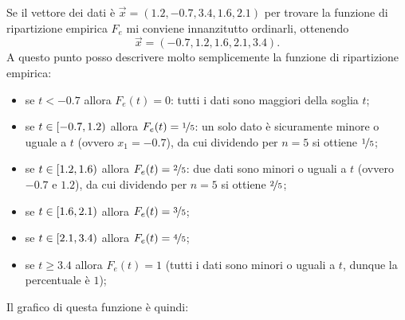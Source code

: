 \begin{example}
    Se il vettore dei dati è $\vec x = (1.2, -0.7, 3.4, 1.6, 2.1)$ per trovare la funzione di ripartizione empirica $F_e$ mi conviene innanzitutto ordinarli, ottenendo \[
        \vec x = (-0.7, 1.2, 1.6, 2.1, 3.4).    
    \] A questo punto posso descrivere molto semplicemente la funzione di ripartizione empirica:
    \begin{itemize}
        \item se $t < -0.7$ allora $F_e(t) = 0$: tutti i dati sono maggiori della soglia $t$;
        \item se $t \in [-0.7, 1.2)$ allora $F_e(t) = \nicefrac{1}{5}$: un solo dato è sicuramente minore o uguale a $t$ (ovvero $x_1 = -0.7$), da cui dividendo per $n = 5$ si ottiene $\nicefrac{1}{5}$;
        \item se $t \in [1.2, 1.6)$ allora $F_e(t) = \nicefrac{2}{5}$: due dati sono minori o uguali a $t$ (ovvero $-0.7$ e $1.2$), da cui dividendo per $n = 5$ si ottiene $\nicefrac{2}{5}$;
        \item se $t \in [1.6, 2.1)$ allora $F_e(t) = \nicefrac{3}{5}$;
        \item se $t \in [2.1, 3.4)$ allora $F_e(t) = \nicefrac{4}{5}$;
        \item se $t \geq 3.4$ allora $F_e(t) = 1$ (tutti i dati sono minori o uguali a $t$, dunque la percentuale è $1$);
    \end{itemize}

    Il grafico di questa funzione è quindi:
    \begin{center}
    \end{center}
\end{example}

